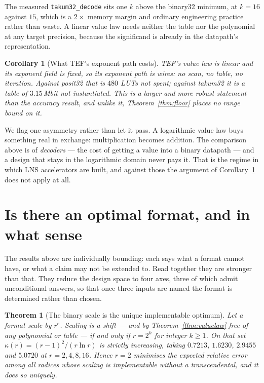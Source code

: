 \documentclass[11pt]{article}
\newtheorem{theorem}{Theorem}
\newtheorem{corollary}{Corollary}
\theoremstyle{definition}
\begin{document}
The measured \texttt{takum32\_decode} sits one $k$ above the binary32 minimum, at
$k = 16$ against $15$, which is a $2\times$ memory margin and ordinary engineering
practice rather than waste. A linear value law needs neither the table nor the
polynomial at any target precision, because the significand is already in the
datapath's representation.

\begin{corollary}[What TEF's exponent path costs]
\label{cor:zeropath}
TEF's value law is linear and its exponent field is fixed, so its exponent path
is wires: no scan, no table, no iteration. Against posit32 that is $480$ LUTs not
spent; against takum32 it is a table of $3.15$\,Mbit not instantiated. This is a
larger and more robust statement than the accuracy result, and unlike it,
Theorem~\ref{thm:floor} places no range bound on it.
\end{corollary}

We flag one asymmetry rather than let it pass. A logarithmic value law buys
something real in exchange: multiplication becomes addition. The comparison above
is of \emph{decoders} --- the cost of getting a value into a binary datapath ---
and a design that stays in the logarithmic domain never pays it. That is the
regime in which LNS accelerators are built, and against those the argument of
Corollary~\ref{cor:zeropath} does not apply at all.


\section{Is there an optimal format, and in what sense}
\label{sec:optimal}

The results above are individually bounding: each says what a format cannot have,
or what a claim may not be extended to. Read together they are stronger than that.
They reduce the design space to four axes, three of which admit unconditional
answers, so that once three inputs are named the format is determined rather than
chosen.

\begin{theorem}[The binary scale is the unique implementable optimum]
\label{thm:radixopt}
Let a format scale by $r^{e}$. Scaling is a shift --- and by
Theorem~\ref{thm:valuelaw} free of any polynomial or table --- if and only if
$r = 2^{k}$ for integer $k \geq 1$. On that set $\kappa(r) = (r-1)^2/(r\ln r)$ is
strictly increasing, taking $0.7213$, $1.6230$, $2.9455$ and $5.0720$ at
$r = 2, 4, 8, 16$. Hence $r = 2$ minimises the expected relative error among all
radices whose scaling is implementable without a transcendental, and it does so
uniquely.
\end{theorem}
\end{document}

